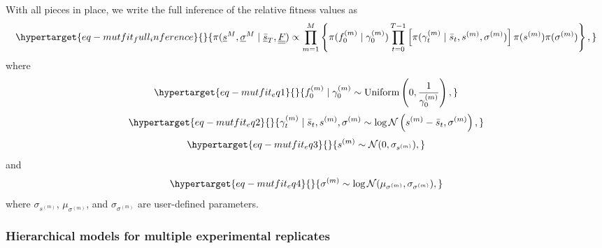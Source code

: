 \documentclass[
]{scrartcl}
\begin{document}
\begin{refsegment}
With all pieces in place, we write the full inference of the relative
fitness values as
\begin{equation}\protect\hypertarget{eq-mutfit_full_inference}{}{
\pi(
    \underline{s}^M ,\underline{\sigma}^M \mid 
    \underline{\bar{s}}_T, \underline{\underline{F}}
) \propto
\prod_{m=1}^M \left\{ 
    \pi(f_0^{(m)} \mid \gamma_0^{(m)})
    \prod_{t=0}^{T-1} \left[
        \pi(\gamma_t^{(m)} \mid \bar{s}_t, s^{(m)}, \sigma^{(m)})
    \right]
    \pi(s^{(m)}) \pi(\sigma^{(m)})
\right\},
}\label{eq-mutfit_full_inference}\end{equation} where
\begin{equation}\protect\hypertarget{eq-mutfit_eq1}{}{
f_0^{(m)} \mid \gamma_0^{(m)} \sim 
\operatorname{Uniform}\left(0, \frac{1}{\gamma_0^{(m)}} \right),
}\label{eq-mutfit_eq1}\end{equation}
\begin{equation}\protect\hypertarget{eq-mutfit_eq2}{}{
\gamma_t^{(m)} \mid \bar{s}_t, s^{(m)}, \sigma^{(m)} \sim 
\log\mathcal{N}\left(s^{(m)} - \bar{s}_t, \sigma^{(m)} \right),
}\label{eq-mutfit_eq2}\end{equation}
\begin{equation}\protect\hypertarget{eq-mutfit_eq3}{}{
s^{(m)} \sim \mathcal{N}(0, \sigma_{s^{(m)}}),
}\label{eq-mutfit_eq3}\end{equation} and
\begin{equation}\protect\hypertarget{eq-mutfit_eq4}{}{
\sigma^{(m)} \sim \log\mathcal{N}(\mu_{\sigma^{(m)}}, \sigma_{\sigma^{(m)}}),
}\label{eq-mutfit_eq4}\end{equation} where \(\sigma_{s^{(m)}}\),
\(\mu_{\sigma^{(m)}}\), and \(\sigma_{\sigma^{(m)}}\) are user-defined
parameters.

\hypertarget{sec-hierarchical_model}{%
\subsubsection{Hierarchical models for multiple experimental
replicates}\label{sec-hierarchical_model}}


\end{refsegment}
\end{document}
